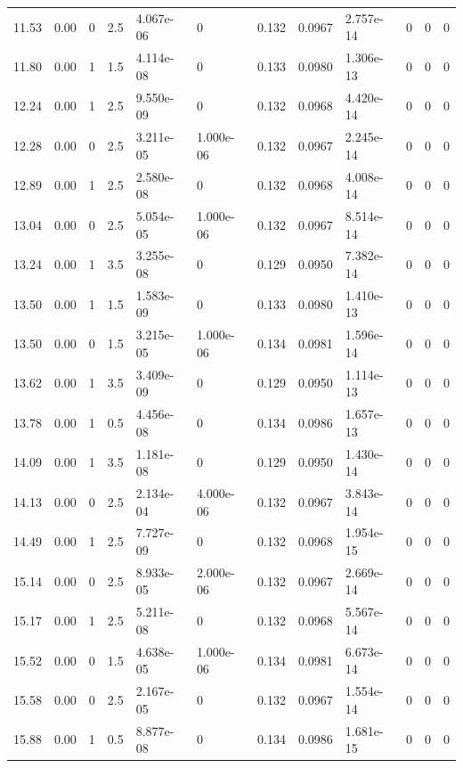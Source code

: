 \documentclass[preview]{standalone}
\begin{document}
{{{\begin{tabular}{L{1.2cm}C{1.2cm} C{0.3cm}C{0.5cm} C{1.4cm}C{1.4cm} C{1.4cm}C{1.4cm} C{1.6cm}C{1.6cm} C{1.6cm}C{1.6cm}}
  11.53  &  0.00  & 0     & 2.5 &  4.067e-06  & 0  &  0.132&   0.0967& 2.757e-14 & 0   &  0 & 0  \\ 
  11.80  &  0.00  & 1     & 1.5 &  4.114e-08  & 0  &  0.133&   0.0980& 1.306e-13 & 0   &  0 & 0  \\ 
  12.24  &  0.00  & 1     & 2.5 &  9.550e-09  & 0  &  0.132&   0.0968& 4.420e-14 & 0   &  0 & 0  \\ 
  12.28  &  0.00  & 0     & 2.5 &  3.211e-05  & 1.000e-06  &  0.132&   0.0967& 2.245e-14 & 0   &  0 & 0  \\ 
  12.89  &  0.00  & 1     & 2.5 &  2.580e-08  & 0  &  0.132&   0.0968& 4.008e-14 & 0   &  0 & 0  \\ 
  13.04  &  0.00  & 0     & 2.5 &  5.054e-05  & 1.000e-06  &  0.132&   0.0967& 8.514e-14 & 0   &  0 & 0  \\ 
  13.24  &  0.00  & 1     & 3.5 &  3.255e-08  & 0  &  0.129&   0.0950& 7.382e-14 & 0   &  0 & 0  \\ 
  13.50  &  0.00  & 1     & 1.5 &  1.583e-09  & 0  &  0.133&   0.0980& 1.410e-13 & 0   &  0 & 0  \\ 
  13.50  &  0.00  & 0     & 1.5 &  3.215e-05  & 1.000e-06  &  0.134&   0.0981& 1.596e-14 & 0   &  0 & 0  \\ 
  13.62  &  0.00  & 1     & 3.5 &  3.409e-09  & 0  &  0.129&   0.0950& 1.114e-13 & 0   &  0 & 0  \\ 
  13.78  &  0.00  & 1     & 0.5 &  4.456e-08  & 0  &  0.134&   0.0986& 1.657e-13 & 0   &  0 & 0  \\ 
  14.09  &  0.00  & 1     & 3.5 &  1.181e-08  & 0  &  0.129&   0.0950& 1.430e-14 & 0   &  0 & 0  \\ 
  14.13  &  0.00  & 0     & 2.5 &  2.134e-04  & 4.000e-06  &  0.132&   0.0967& 3.843e-14 & 0   &  0 & 0  \\ 
  14.49  &  0.00  & 1     & 2.5 &  7.727e-09  & 0  &  0.132&   0.0968& 1.954e-15 & 0   &  0 & 0  \\ 
  15.14  &  0.00  & 0     & 2.5 &  8.933e-05  & 2.000e-06  &  0.132&   0.0967& 2.669e-14 & 0   &  0 & 0  \\ 
  15.17  &  0.00  & 1     & 2.5 &  5.211e-08  & 0  &  0.132&   0.0968& 5.567e-14 & 0   &  0 & 0  \\ 
  15.52  &  0.00  & 0     & 1.5 &  4.638e-05  & 1.000e-06  &  0.134&   0.0981& 6.673e-14 & 0   &  0 & 0  \\ 
  15.58  &  0.00  & 0     & 2.5 &  2.167e-05  & 0  &  0.132&   0.0967& 1.554e-14 & 0   &  0 & 0  \\ 
  15.88  &  0.00  & 1     & 0.5 &  8.877e-08  & 0  &  0.134&   0.0986& 1.681e-15 & 0   &  0 & 0  \\ 

\end{tabular}}}}
\end{document}
